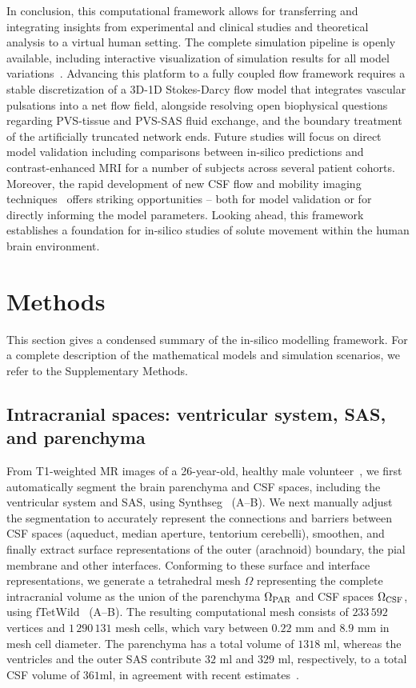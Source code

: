 \documentclass[fleqn,10pt]{wlscirep}
\begin{document}
In conclusion, this computational framework allows for transferring
and integrating insights from experimental and clinical studies and
theoretical analysis to a virtual human setting. The complete
simulation pipeline is openly available, including interactive
visualization of simulation results for all model
variations~\cite{ZENODO}. Advancing this platform to a fully coupled flow framework requires a stable discretization of a 3D-1D Stokes-Darcy flow model that integrates vascular pulsations into a net flow field, alongside resolving open biophysical questions regarding PVS-tissue and PVS-SAS fluid exchange, and the boundary treatment of the artificially truncated network ends. Future studies will focus on direct model validation including
comparisons between in-silico predictions and contrast-enhanced MRI
for a number of subjects across several patient cohorts. Moreover, the
rapid development of new CSF flow and mobility imaging
techniques~\cite{dong2025quantifying, hirschler2025region,
  vikner2025imaging} offers striking opportunities -- both for model
validation or for directly informing the model parameters. Looking
ahead, this framework establishes a foundation for in-silico studies
of solute movement within the human brain environment.

\section*{Methods}

This section gives a condensed summary of the in-silico modelling
framework. For a complete description of the mathematical models and
simulation scenarios, we refer to the Supplementary Methods.

\subsection*{Intracranial spaces: ventricular system, SAS, and parenchyma}

From T1-weighted MR images of a 26-year-old, healthy male volunteer~\cite{hodneland2019new},
we first automatically segment the brain parenchyma and CSF spaces,
including the ventricular system and SAS, using
Synthseg~\cite{billot2023robust,billot2023synthseg}
(A--B). We next manually adjust the segmentation to
accurately represent the connections and barriers between CSF spaces (aqueduct,
median aperture, tentorium cerebelli), smoothen, and finally extract
surface representations of the outer (arachnoid) boundary, the pial
membrane and other interfaces. Conforming to these surface and
interface representations, we generate a tetrahedral mesh $\Omega$
representing the complete intracranial volume as the union of the
parenchyma $\Omega_{\rm PAR}$ and CSF spaces $\Omega_{\rm CSF}$, using
fTetWild~\cite{hu2020fast} (A--B). The resulting
computational mesh consists of $233\,592$ vertices and $1\,290\,131$
mesh cells, which vary between $0.22$ mm and $8.9$ mm in mesh cell
diameter. The parenchyma has a total volume of $1318$ ml, whereas the
ventricles and the outer SAS contribute $32$ ml and $329$ ml,
respectively, to a total CSF volume of $361$ml, in agreement with
recent estimates~\cite{hladky2024regulation}.
\end{document}
